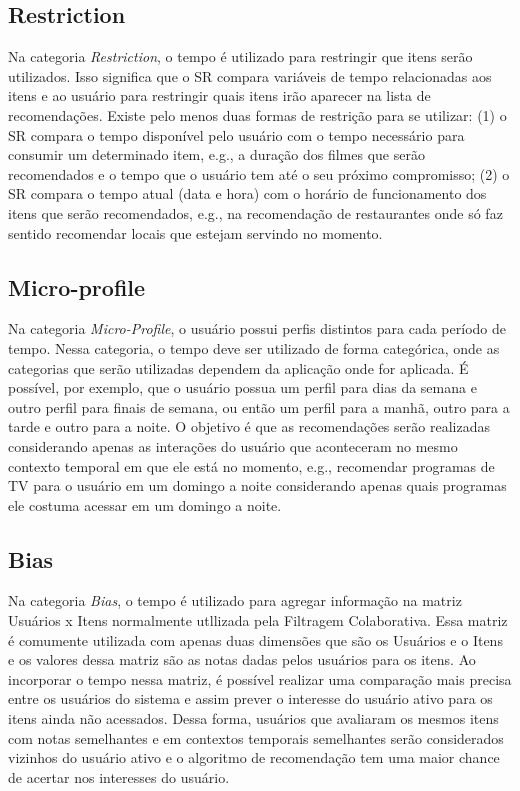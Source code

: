 \subsection{Restriction}\label{subsection:restriction}

Na categoria \textit{Restriction}, o tempo é utilizado para restringir que itens serão utilizados. Isso significa que o SR
compara variáveis de tempo relacionadas aos itens e ao usuário para restringir quais itens irão aparecer na lista de
recomendações. Existe pelo menos duas formas de restrição para se utilizar: (1) o SR compara o tempo disponível pelo
usuário com o tempo necessário para consumir um determinado item, e.g., a duração dos filmes que serão recomendados e
o tempo que o usuário tem até o seu próximo compromisso; (2) o SR compara o tempo atual (data e hora) com o horário de
funcionamento dos itens que serão recomendados, e.g., na recomendação de restaurantes onde só faz sentido recomendar
locais que estejam servindo no momento.

\subsection{Micro-profile}

Na categoria \textit{Micro-Profile}, o usuário possui perfis distintos para cada período de tempo. Nessa categoria, o tempo
deve ser utilizado de forma categórica, onde as categorias que serão utilizadas dependem da aplicação onde for aplicada.
É possível, por exemplo, que o usuário possua um perfil para dias da semana e outro perfil para finais de semana, ou
então um perfil para a manhã, outro para a tarde e outro para a noite. O objetivo é que as recomendações serão
realizadas considerando apenas as interações do usuário que aconteceram no mesmo contexto temporal em que ele está no
momento, e.g., recomendar programas de TV para o usuário em um domingo a noite considerando apenas quais programas ele
costuma acessar em um domingo a noite.

\subsection{Bias}

Na categoria \textit{Bias}, o tempo é utilizado para agregar informação na matriz Usuários x Itens normalmente utllizada pela
Filtragem Colaborativa. Essa matriz é comumente utilizada com apenas duas dimensões que são os Usuários e o Itens e os
valores dessa matriz são as notas dadas pelos usuários para os itens. Ao incorporar o tempo nessa matriz, é possível
realizar uma comparação mais precisa entre os usuários do sistema e assim prever o interesse do usuário ativo para os
itens ainda não acessados. Dessa forma, usuários que avaliaram os mesmos itens com notas semelhantes e em contextos
temporais semelhantes serão considerados vizinhos do usuário ativo e o algoritmo de recomendação tem uma maior chance
de acertar nos interesses do usuário.

